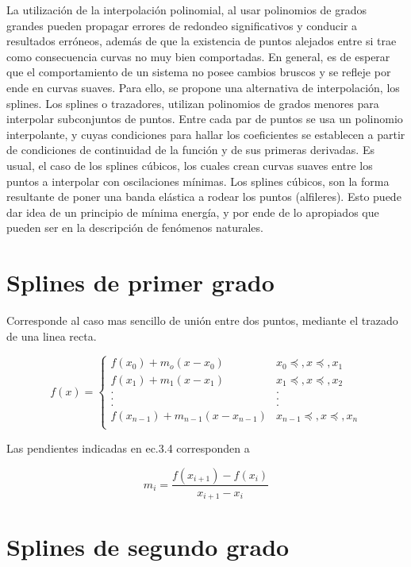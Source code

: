 \documentclass[letterpaper,10pt,oneside]{sphinxmanual}
\theoremstyle{plain}%
\theoremstyle{definition}%
\theoremstyle{remark}%
\begin{document}
La utilización de la interpolación polinomial, al usar polinomios de grados
grandes pueden propagar errores de redondeo significativos y conducir a resultados
erróneos, además de que la existencia de puntos alejados entre si trae como
consecuencia curvas no muy bien comportadas.
En general, es de esperar que el comportamiento de un sistema no posee cambios
bruscos y se refleje por ende en curvas suaves. Para ello, se propone una alternativa
de interpolación, los splines.
Los splines o trazadores, utilizan polinomios de grados menores para interpolar
subconjuntos de puntos. Entre cada par de puntos se usa un polinomio interpolante,
y cuyas condiciones para hallar los coeficientes se establecen a partir de
condiciones de continuidad de la función y de sus primeras derivadas.
Es usual, el caso de los splines cúbicos, los cuales crean curvas suaves entre los
puntos a interpolar con oscilaciones mínimas. Los splines cúbicos, son la forma
resultante de poner una banda elástica a rodear los puntos (alfileres). Esto puede
dar idea de un principio de mínima energía, y por ende de lo apropiados que
pueden ser en la descripción de fenómenos naturales.

\section{Splines de primer grado}

Corresponde al caso mas sencillo de unión entre dos puntos, mediante el trazado de una linea recta.

\begin{equation}
	f(x)=
	\begin{cases}
	f(x_0)+m_o(x-x_0)				 & x_0\preceq,x\preceq,x_1 \\
	f(x_1)+m_1(x-x_1)				 & x_1\preceq,x\preceq,x_2 \\ 
	.&. \\
	.&. \\
	.&. \\
	f(x_{n-1})+m_{n-1}(x-x_{n-1})				 & x_{n-1}\preceq,x\preceq,x_n \\
	\end{cases}
\end{equation}

Las pendientes indicadas en ec.3.4 corresponden a 

\begin{equation}
	m_i=\frac{f(x_{i+1})-f(x_i)}{x_{i+1}-x_i}
\end{equation}

\section{Splines de segundo grado}
\end{document}
